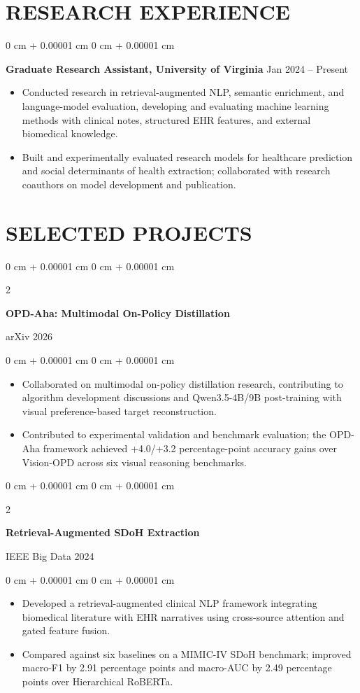 \documentclass[10pt, letterpaper]{article}
\newenvironment{highlights}{
    \begin{itemize}[
        topsep=0.03 cm,
        parsep=0.03 cm,
        partopsep=0pt,
        itemsep=0pt,
        leftmargin=0 cm + 10pt
    ]
}{
    \end{itemize}
} %
\newenvironment{onecolentry}{
    \begin{adjustwidth}{
        0 cm + 0.00001 cm
    }{
        0 cm + 0.00001 cm
    }
}{
    \end{adjustwidth}
} %
\newenvironment{twocolentry}[2][]{
    \onecolentry
    \def\secondColumn{#2}
    \setcolumnwidth{\fill, 4.5 cm}
    \begin{paracol}{2}
}{
    \switchcolumn \raggedleft \secondColumn
    \end{paracol}
    \endonecolentry
} %
\begin{document}
\section{RESEARCH EXPERIENCE}
\begin{onecolentry}
\textbf{Graduate Research Assistant, University of Virginia} \hfill Jan 2024 -- Present
\begin{highlights}
\item Conducted research in retrieval-augmented NLP, semantic enrichment, and language-model evaluation, developing and evaluating machine learning methods with clinical notes, structured EHR features, and external biomedical knowledge.
\item Built and experimentally evaluated research models for healthcare prediction and social determinants of health extraction; collaborated with research coauthors on model development and publication.
\end{highlights}
\end{onecolentry}
\section{SELECTED PROJECTS}

\begin{twocolentry}{arXiv 2026}
\textbf{OPD-Aha: Multimodal On-Policy Distillation}
\end{twocolentry}
\begin{onecolentry}
\begin{highlights}
\item Collaborated on multimodal on-policy distillation research, contributing to algorithm development discussions and Qwen3.5-4B/9B post-training with visual preference-based target reconstruction.
\item Contributed to experimental validation and benchmark evaluation; the OPD-Aha framework achieved +4.0/+3.2 percentage-point accuracy gains over Vision-OPD across six visual reasoning benchmarks.
\end{highlights}
\end{onecolentry}
\vspace{0.06 cm}

\begin{twocolentry}{IEEE Big Data 2024}
\textbf{Retrieval-Augmented SDoH Extraction}
\end{twocolentry}
\begin{onecolentry}
\begin{highlights}
\item Developed a retrieval-augmented clinical NLP framework integrating biomedical literature with EHR narratives using cross-source attention and gated feature fusion.
\item Compared against six baselines on a MIMIC-IV SDoH benchmark; improved macro-F1 by 2.91 percentage points and macro-AUC by 2.49 percentage points over Hierarchical RoBERTa.
\end{highlights}
\end{onecolentry}
\vspace{0.06 cm}
\end{document}
